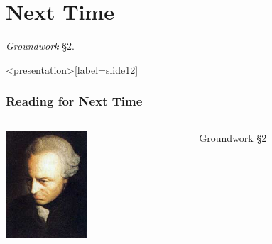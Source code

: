 
\section{Next Time}\label{sec:next_time} %

\emph{Groundwork} \S 2.

\begin{frame}<presentation>[label=slide12]
    \frametitle{Reading for Next Time}
        \begin{columns}
            \begin{column}{3cm}
                \includegraphics[height=4cm]{../../graphics/kant.jpg}
            \end{column}
            \begin{column}{7cm}
                \alert{Groundwork \S 2}
            \end{column}
        \end{columns}
\end{frame}



